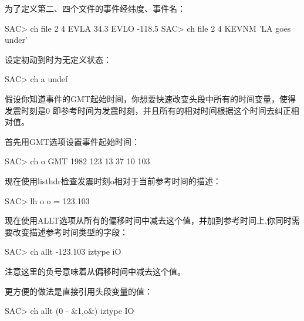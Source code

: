 为了定义第二、四个文件的事件经纬度、事件名：
\begin{SACCode}
SAC> ch file 2 4 EVLA 34.3 EVLO -118.5
SAC> ch file 2 4 KEVNM 'LA goes under'
\end{SACCode}

设定初动到时为无定义状态：
\begin{SACCode}
SAC> ch a undef
\end{SACCode}

假设你知道事件的GMT起始时间，你想要快速改变头段中所有的时间变量，使得发震时刻是0
即参考时间为发震时刻，并且所有的相对时间根据这个时间去纠正相对值。

首先用GMT选项设置事件起始时间：
\begin{SACCode}
SAC> ch o GMT 1982 123 13 37 10 103
\end{SACCode}
现在使用listhdr检查发震时刻o相对于当前参考时间的描述：
\begin{SACCode}
SAC> lh o
 o = 123.103
\end{SACCode}
现在使用ALLT选项从所有的偏移时间中减去这个值，并加到参考时间上,你同时需要改变描述参考时间类型的字段：
\begin{SACCode}
SAC> ch allt -123.103 iztype iO
\end{SACCode}
注意这里的负号意味着从偏移时间中减去这个值。

更方便的做法是直接引用头段变量的值：
\begin{SACCode}
SAC> ch allt (0 - &1,o&) iztype IO
\end{SACCode}
